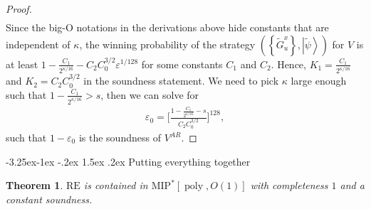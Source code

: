\documentclass[11pt]{article}
\makeatletter
\renewcommand{\subsection}{\@startsection{subsection}{2}{\z@}%
             {-3.25ex\@plus -1ex \@minus -.2ex}%
             {1.5ex \@plus .2ex}%
             {\normalfont\large\scshape\bfseries}}
\theoremstyle{plain}
\newtheorem{theorem}{Theorem}[section]
\theoremstyle{definition}
\newcommand {\set} [1] {\ensuremath{ \left\lbrace #1 \right\rbrace }}
\newcommand {\ket} [1] {\ensuremath{ \left| #1 \right\rangle }}
\newcommand{\poly} {\ensuremath{\operatorname{poly}}}
\newcommand{\ep} {\ensuremath{\varepsilon}}
\newcommand{\1}{\mathbb{1}} %
\newcommand{\tG}{\tilde{G}}
\newcommand{\tpsi}{\tilde{\psi}}
\newcommand{\MIP}{\mathrm{MIP}}
\newcommand{\RE}{\mathrm{RE}}
\makeatother
\begin{document}
\begin{proof}
\begin{align*}
\end{align*}
Since the big-O notations in the derivations above hide constants that are independent of $\kappa$, 
the winning probability of the strategy $(\set{ \tG^x_u }, \ket{\tpsi})$ for $V$ 
is at least $1 -\frac{C_1}{2^{\kappa/16}} - C_2C_0^{3/2}\ep^{1/128}$ for some constants $C_1$ and $C_2$.
Hence, $K_1 = \frac{C_1}{2^{\kappa/16}}$ and $K_2 = C_2C_0^{3/2}$ in the soundness statement.
We need to pick $\kappa$ large enough such that $1 -\frac{C_1}{2^{\kappa/16}} > s$, then we can solve for 
\begin{align*}
    \ep_0 = \Big[\frac{1 - \frac{C_1}{2^{\kappa/16}} - s}{ C_2 C_0^{3/2}}\Big]^{128},
\end{align*}
such that $1 - \ep_0$ is the soundness of $V^{AR}$.
\end{proof}

\subsection{Putting everything together}
\begin{theorem}
    \label{thm:re}
    $\RE$ is contained in $\MIP^\ast[\poly, O(1)]$ with completeness $1$ and a constant soundness. 
\end{theorem}
\end{document}

